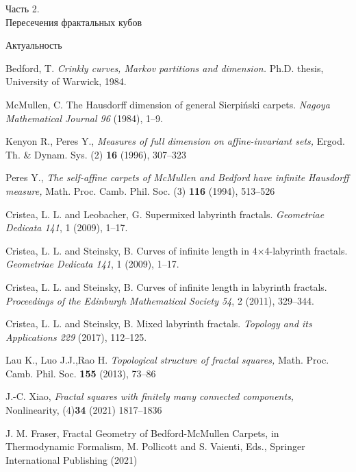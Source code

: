 \documentclass[aspectratio=1610, 10pt, notheorems]{beamer}
\begin{document}
\begin{frame}{}
\Huge{Часть 2.\\
Пересечения фрактальных кубов}
\end{frame}



\begin{frame}{Актуальность}
\begin{thebibliography}{9}
\footnotesize{

	{\sc Bedford, T.}
    {\it Crinkly curves, Markov partitions and dimension.}
    Ph.D. thesis, University of Warwick, 1984.

	{\sc McMullen, C.}
	{The {Hausdorff} dimension of general {Sierpi{\'n}ski} carpets.}
	{\it Nagoya Mathematical Journal 96} (1984), 1--9.

    {\sc Kenyon R., Peres Y.,} 
    {\em Measures of full dimension on affine-invariant sets,}
    {Ergod. Th. \& Dynam. Sys. (2) \textbf{16} (1996), 307--323}

    {\sc Peres Y.,}
    {\em The self-affine carpets of McMullen and Bedford have infinite Hausdorff measure,}
    {Math. Proc. Camb. Phil. Soc. (3) \textbf{116} (1994), 513--526}


	{\sc Cristea, L. L. and Leobacher, G.}
	{Supermixed labyrinth fractals.}
	{\it Geometriae Dedicata 141}, 1 (2009), 1--17.

	{\sc Cristea, L. L. and Steinsky, B.}
	{Curves of infinite length in 4×4-labyrinth fractals.}
	{\it Geometriae Dedicata 141}, 1 (2009), 1--17.

	{\sc Cristea, L. L. and Steinsky, B.}
	{Curves of infinite length in labyrinth fractals.}
	{\it Proceedings of the Edinburgh Mathematical Society 54}, 2 (2011), 329--344.
	
	{\sc Cristea, L. L. and Steinsky, B.}
	{Mixed labyrinth fractals.}
	{\it Topology and its Applications 229} (2017), 112–125.

    {\sc Lau K., Luo J.J.,Rao H.}
    {\em Topological structure of fractal squares,}
    {Math. Proc. Camb. Phil. Soc. \textbf{155} (2013), 73--86}
}

	{\sc J.-C. Xiao,} 
	{\em Fractal squares with finitely many connected components,}
	{Nonlinearity, (4)\textbf{34} (2021) 1817–1836}
	
	{\sc J. M. Fraser,}
	{Fractal Geometry of Bedford-McMullen Carpets,} 
	{in Thermodynamic Formalism, M. Pollicott and S. Vaienti, Eds., 
	Springer International Publishing (2021)}
\end{thebibliography}
\end{frame}
\end{document}
